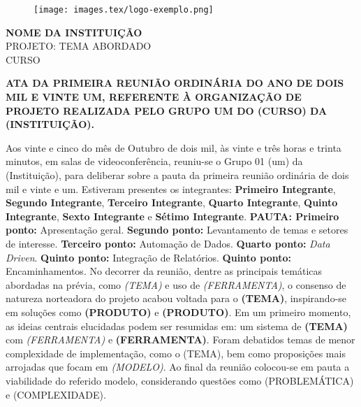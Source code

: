 \documentclass[a4paper,10pt]{report}
\begin{document}
 
    \begin{center}
        \begin{large}
            \begin{figure}[ht]
            \centering
            \texttt{[image: images.tex/logo-exemplo.png]}
            \end{figure}
            
            \textbf{NOME DA INSTITUIÇÃO}\\
            PROJETO: TEMA ABORDADO\\
            CURSO\\[1.5cm]
        \end{large}
    \end{center}
            
    \doublespacing
        \begin{justify}
            \begin{large}
                \textbf{ATA DA PRIMEIRA REUNIÃO ORDINÁRIA DO ANO DE DOIS MIL E VINTE UM, REFERENTE À ORGANIZAÇÃO DE PROJETO REALIZADA PELO GRUPO UM DO (CURSO) DA (INSTITUIÇÃO).}\\
            \end{large}
        \end{justify}
        
    \begin{justify}
        \begin{large}
            Aos vinte e cinco do mês de Outubro de dois mil, às vinte e três horas e trinta minutos, em salas de videoconferência, reuniu-se o Grupo 01 (um) da (Instituição), para deliberar sobre a pauta da primeira reunião ordinária de dois mil e vinte e um. Estiveram presentes os integrantes: \textbf{Primeiro Integrante}, \textbf{Segundo Integrante}, \textbf{Terceiro Integrante}, \textbf{Quarto Integrante}, \textbf{Quinto Integrante}, \textbf{Sexto Integrante} e \textbf{Sétimo Integrante}. \textbf{PAUTA: Primeiro ponto:} Apresentação geral. \textbf{Segundo ponto:} Levantamento de temas e setores de interesse. \textbf{Terceiro ponto:} Automação de Dados. \textbf{Quarto ponto:} \textit{Data Driven}. \textbf{Quinto ponto:} Integração de Relatórios. \textbf{Quinto ponto:} Encaminhamentos. No decorrer da reunião, dentre as principais temáticas abordadas na prévia, como \textit{(TEMA)} e uso de \textit{(FERRAMENTA)}, o consenso de natureza norteadora do projeto acabou voltada para o \textbf{(TEMA)}, inspirando-se em soluções como \textbf{(PRODUTO)} e \textbf{(PRODUTO)}. Em um primeiro momento, as ideias centrais elucidadas podem ser resumidas em: um sistema de \textbf{(TEMA)} com \textit{(FERRAMENTA)} e \textbf{(FERRAMENTA)}. Foram debatidos temas de menor complexidade de implementação, como o (TEMA), bem como proposições mais arrojadas que focam em \textit{(MODELO)}. Ao final da reunião colocou-se em pauta a viabilidade do referido modelo, considerando questões como (PROBLEMÁTICA) e (COMPLEXIDADE).
        \end{large}
    \end{justify}
        
\end{document}
